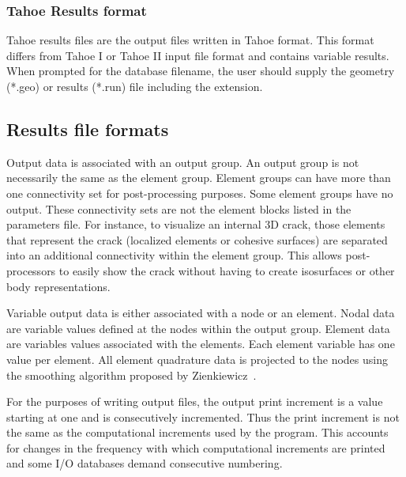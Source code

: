 \subsubsection{\textsf{Tahoe Results} format}
\label{sect.file.tahoeresults}
Tahoe results files are the output files written in Tahoe format. This format 
differs from Tahoe I or Tahoe II input file format and contains variable 
results. When prompted for the database filename, the user should supply the 
geometry (*.geo) or results (*.run) file including the extension. 

\subsection{Results file formats}
\label{sect.file.results}
Output data is associated with an output group.  An output group is not
necessarily the same as the element group.  Element groups can have more
than one connectivity set for post-processing purposes.  Some element
groups have no output.  These connectivity sets are not the element blocks
listed in the parameters file.  For instance, to visualize an internal 3D
crack, those elements that represent the crack (localized elements or
cohesive surfaces) are separated into an additional connectivity within the
element group.  This allows post-processors to easily show the crack
without having to create isosurfaces or other body representations.

Variable output data is either associated with a node or an element.  Nodal
data are variable values defined at the nodes within the output group. 
Element data are variables values associated with the elements.  Each
element variable has one value per element.  All element quadrature data is
projected to the nodes using the smoothing algorithm proposed by 
Zienkiewicz~\cite{Zienkiewicz}.

For the purposes of writing output files, the output print increment is a
value starting at one and is consecutively incremented.  Thus the print
increment is not the same as the computational increments used by the
program.  This accounts for changes in the frequency with which
computational increments are printed and some I/O databases demand
consecutive numbering.

